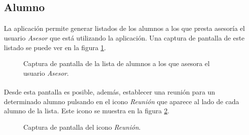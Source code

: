 \subsection{Alumno}\label{verAlumnos}

  \paragraph{}La aplicación permite generar listados de los alumnos a los que
  presta asesoría el usuario \textit{Asesor} que está utilizando la aplicación.
  Una captura de pantalla de este listado se puede ver en la figura
  \ref{capturaPantallaListaAlumnosDeAsesor}.

  \begin{figure}[!ht]
    \begin{center}
      \caption{Captura de pantalla de la lista de alumnos a los que asesora el usuario \textit{Asesor}.}
      \label{capturaPantallaListaAlumnosDeAsesor}
    \end{center}
  \end{figure}

  \paragraph{}Desde esta pantalla es posible, además, establecer una reunión
  para un determinado alumno pulsando en el icono \textit{Reunión} que aparece
  al lado de cada alumno de la lista. Este icono se muestra en la figura
  \ref{capturaIconoReunion}.

  \begin{figure}[!ht]
    \begin{center}
      \caption{Captura de pantalla del icono \textit{Reunión}.}
      \label{capturaIconoReunion}
    \end{center}
  \end{figure}
